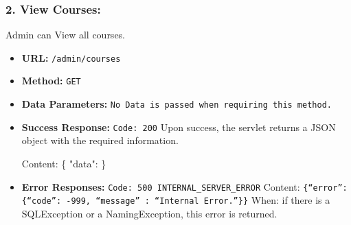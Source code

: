 \subsubsection* {2. View Courses:}
Admin can View all courses.
\begin{itemize}
    \item \textbf {URL:} \texttt{/admin/courses}
    \item \textbf {Method:} \texttt{GET}
    \item \textbf {Data Parameters:} \texttt{No Data is passed when requiring this method.}
    \item \textbf {Success Response:} \texttt{Code: 200} \newline
    Upon success, the servlet returns a JSON object with the required information.\newline

    Content: \newline
    \{ \newline
    "data":  \newline
    \}
    \item \textbf {Error Responses:} \texttt{Code: 500 INTERNAL\_SERVER\_ERROR} \newline
    Content: \texttt {\{“error”: \{“code”: -999, “message” : “Internal Error.”\}\}} \newline
    When: if there is a SQLException or a NamingException, this error is returned.
\end{itemize}